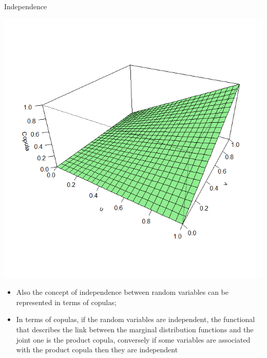 \documentclass[11pt]{beamer}
\theoremstyle{plain}
\theoremstyle{definition}
\theoremstyle{remark}
\begin{document}
\begin{frame}{Independence}
	\noindent
	\begin{minipage}{0.5\textwidth}%
	\includegraphics[width=\linewidth]{fig/copula_prodotto.png}
	\end{minipage}%
	\hfill%
	\begin{minipage}{0.5\textwidth}
	\begin{itemize}
		\item Also the concept of independence between random variables can be represented in terms of copulas;
		\item In terms of copulas, if the random variables are independent, the functional that describes the link between the marginal 
		distribution functions and the joint one is the product copula, conversely if some variables are associated with the product copula then
		they are independent
	\end{itemize}
	\end{minipage}
\end{frame}
\end{document}
